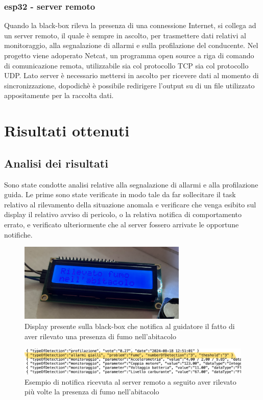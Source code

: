 \documentclass[12pt, a4paper, italian]{report}
\numberwithin{figure}{chapter}
\numberwithin{table}{chapter}
\begin{document}
\subsection{esp32 - server remoto}
Quando la black-box rileva la presenza di una connessione Internet, si collega ad un server remoto, il quale è sempre in ascolto, per trasmettere dati relativi al monitoraggio, alla segnalazione di allarmi e sulla profilazione del conducente. 
Nel progetto viene adoperato Netcat, un programma open source a riga di comando di comunicazione remota, utilizzabile sia col protocollo TCP sia col protocollo UDP. Lato server è necessario mettersi in ascolto per ricevere dati al momento di sincronizzazione, dopodichè è possibile redirigere l'output su di un file utilizzato appositamente per la raccolta dati. \cite{Netcat}

\chapter{Risultati ottenuti}
\section{Analisi dei risultati}
Sono state condotte analisi relative alla segnalazione di allarmi e alla profilazione guida. Le prime sono state verificate in modo tale da far sollecitare il task relativo al rilevamento della situazione anomala e verificare che venga esibito sul display il relativo avviso di pericolo, o la relativa notifica di comportamento errato, e verificato ulteriormente che al server fossero arrivate le opportune notifiche. 

\begin{figure}[h]
  \centering
  \includegraphics[width=8cm]{fumoLCD.png}
  \caption{Display presente sulla black-box che notifica al guidatore il fatto di aver rilevato una presenza di fumo nell'abitacolo}
  \label{fig:fumoLCD}
\end{figure}

\begin{figure}[h]
  \centering
  \includegraphics[width=14cm]{fumoServer.jpg}
  \caption{Esempio di notifica ricevuta al server remoto a seguito aver rilevato più volte la presenza di fumo nell'abitacolo}
  \label{fig:fumoServer}
\end{figure}
\end{document}
